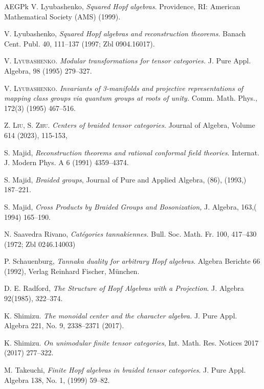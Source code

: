 \documentclass[11pt]{amsart}
\renewcommand{\_}[1]{\mbox{$_{\left( #1 \right)}$}}
\theoremstyle{plain}
\numberwithin{equation}{section}
\theoremstyle{definition}
\theoremstyle{remark}
\theoremstyle{introTheorems}
\begin{document}
\begin{thebibliography}{AEGPk}
 {\sc V.  Lyubashenko}, \textit{Squared Hopf algebras}. Providence, RI: American Mathematical Society (AMS) (1999).


 {\sc V.  Lyubashenko}, \textit{Squared Hopf algebras and reconstruction theorems}. Banach Cent. Publ. 40, 111--137 (1997; Zbl 0904.16017).

  \textsc{V. Lyubashenko}. \textit{Modular transformations for tensor categories.} J. Pure Appl. Algebra, 98 (1995) 279--327.

  \textsc{V. Lyubashenko}.\textit{ Invariants of 3-manifolds and projective representations of mapping class groups via quantum groups at roots of unity.} Comm. Math. Phys., 172(3) (1995) 467--516.

 \textsc{Z. Liu, S. Zhu}. \emph{Centers of braided tensor categories.} Journal of Algebra,
Volume 614 (2023), 115-153,

 {\sc S. Majid,}
\textit{Reconstruction theorems and rational conformal field theories}. Internat. J. Modern
Phys. A 6 (1991) 4359--4374.

 {\sc S. Majid,}
\textit{Braided groups},
Journal of Pure and Applied Algebra,
 (86),
(1993,) 187--221.

 {\sc S. Majid,}
\textit{Cross Products by Braided Groups and Bosonization,}
J. Algebra,
163,(
1994) 165--190.


  {\sc N. Saavedra Rivano}, \emph{Catégories tannakiennes.} Bull. Soc. Math. Fr. 100, 417--430 (1972; Zbl 0246.14003)

  {\sc P. Schauenburg}, \emph{Tannaka duality for arbitrary Hopf algebras}. Algebra Berichte 66 (1992), Verlag Reinhard Fischer, München. 

 {\sc D. E. Radford}, \emph{The Structure of Hopf Algebras with a Projection}. J. Algebra 92(1985), 322–374.

 {\sc K. Shimizu.} \emph{The monoidal center and the character algebra.}  J. Pure Appl. Algebra 221, No. 9, 2338--2371 (2017).

 {\sc K. Shimizu.} \textit{On unimodular finite tensor categories}, Int. Math. Res. Notices 2017 (2017) 277--322.

 {\sc M. Takeuchi}, \textit{Finite Hopf algebras in braided tensor categories}. J. Pure Appl. Algebra 138, No. 1,  (1999) 59--82.
\end{thebibliography}
\end{document}
